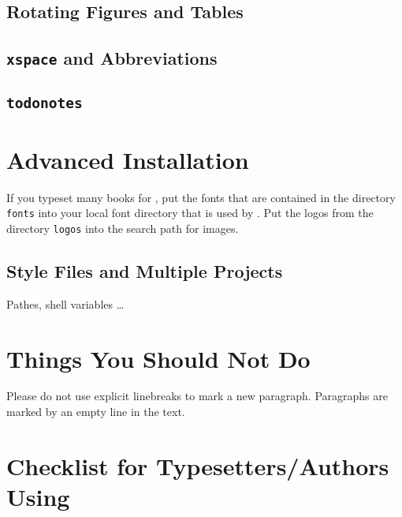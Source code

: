 \subsection{Rotating Figures and Tables}
 

\subsection{\texttt{xspace} and Abbreviations}

\subsection{\texttt{todonotes}}




\section{Advanced Installation}
\label{sec-advanced-latex-installation}

If you typeset many books for \lsp, put the fonts that are contained in the directory \texttt{fonts}
into your local font directory that is used by \xelatex. Put the logos from the directory \texttt{logos} into the
search path for images. 


\subsection{Style Files and Multiple Projects}

Pathes, shell variables \ldots

\section{Things You Should Not Do}

Please do not use explicit linebreaks to mark a new paragraph. Paragraphs are marked by an empty
line in the text.

\section{Checklist for Typesetters/Authors Using \latex}
\label{sec-check-typesetters}


